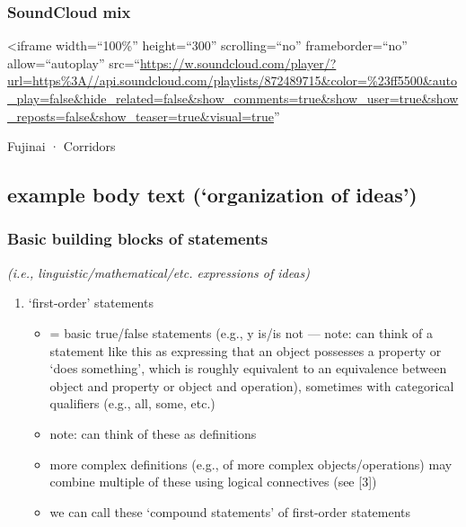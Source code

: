 \documentclass[
]{article}
\providecommand{\tightlist}{%
  \setlength{\itemsep}{0pt}\setlength{\parskip}{0pt}}
\begin{document}
\hypertarget{soundcloud-mix}{%
\subsubsection{SoundCloud mix}\label{soundcloud-mix}}

\textless iframe width=``100\%'' height=``300'' scrolling=``no''
frameborder=``no'' allow=``autoplay''
src=``\url{https://w.soundcloud.com/player/?url=https\%3A//api.soundcloud.com/playlists/872489715\&color=\%23ff5500\&auto_play=false\&hide_related=false\&show_comments=true\&show_user=true\&show_reposts=false\&show_teaser=true\&visual=true}''

Fujinai · Corridors

\hypertarget{basic-building-blocks-of-statements}{%
\subsection{example body text (`organization of
ideas')}\label{basic-building-blocks-of-statements}}

\hypertarget{basic-building-blocks-of-statements-1}{%
\subsubsection{Basic building blocks of
statements}\label{basic-building-blocks-of-statements-1}}

\emph{(i.e., linguistic/mathematical/etc. expressions of ideas)}

\begin{enumerate}
\def\labelenumi{\arabic{enumi})}
\item
  `first-order' statements

  \begin{itemize}
  \tightlist
  \item
    = basic true/false statements (e.g., y is/is not --- note: can think
    of a statement like this as expressing that an object possesses a
    property or `does something', which is roughly equivalent to an
    equivalence between object and property or object and operation),
    sometimes with categorical qualifiers (e.g., all, some, etc.)
  \item
    note: can think of these as definitions
  \item
    more complex definitions (e.g., of more complex objects/operations)
    may combine multiple of these using logical connectives (see
    {[}3{]})
  \item
    we can call these `compound statements' of first-order statements
  \end{itemize}
\end{enumerate}
\end{document}
